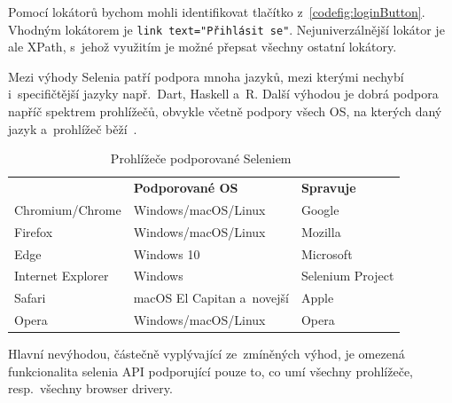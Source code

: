 \documentclass[12pt, a4paper, twoside]{article}
\begin{document}
	Pomocí lokátorů bychom mohli identifikovat tlačítko z~\cref{codefig:loginButton}. Vhodným lokátorem je \texttt{link text="Přihlásit se"}. Nejuniverzálnější lokátor je ale XPath, s~jehož využitím je možné přepsat všechny ostatní lokátory.

	Mezi výhody Selenia patří podpora mnoha jazyků, mezi kterými nechybí i~specifičtější jazyky např.~Dart, Haskell a~R. Další výhodou je dobrá podpora napříč spektrem prohlížečů, obvykle včetně podpory všech OS, na kterých daný jazyk a~prohlížeč běží~\cite{seleniumDocs, seleniumEcosystem}.
	
	\begin{table}[H]
		\centering
		\begin{tabular}{ l|l|l } 
			\rowcolor{tableHeadingBackground}
			\multicolumn{1}{l}{\textbf{Prohlížeč}} & \multicolumn{1}{l}{\textbf{Podporované OS}} & \multicolumn{1}{l}{\textbf{Spravuje}}  \\
			Chromium/Chrome & Windows/macOS/Linux & Google \\ 
			Firefox & Windows/macOS/Linux & Mozilla \\ 
			Edge & Windows 10 & Microsoft \\
			Internet Explorer & Windows & Selenium Project \\
			Safari & macOS El Capitan a~novejší & Apple \\
			Opera & Windows/macOS/Linux & Opera
		\end{tabular}
		\caption{Prohlížeče podporované Seleniem~\cite{seleniumDocs}}
	\end{table}
	
	Hlavní nevýhodou, částečně vyplývající ze~zmíněných výhod, je omezená funkcionalita selenia API podporující pouze to, co umí všechny prohlížeče, resp.~všechny browser drivery.
\end{document}
